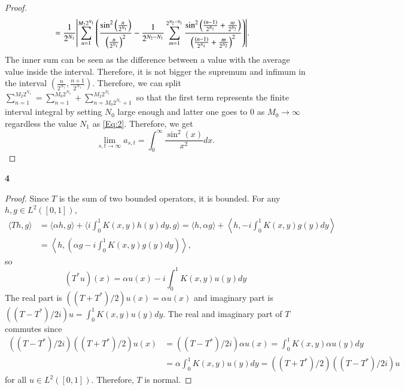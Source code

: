 \documentclass[a4paper, 12pt]{article}
\theoremstyle{Mydefinition}
\theoremstyle{Mytheorem}
\begin{document}
\begin{proof}
\begin{equation}
\begin{split}
    &= \frac{1}{2^{N_1}}\abs{\sum_{n=1}^{M_2 2^{N_1}}\left(\frac{\sin^2\left(\frac{n}{2^{N_1}}\right)}{\left(\frac{n}{2^{N_1}}\right)^2} - \frac{1}{2^{N_2-N_1}} \sum_{m=1}^{2^{N_2-N_1}}\frac{\sin^2\left(\frac{(n-1)}{2^{N_1} }+ \frac{m}{2^{N_2}}\right)}{\left(\frac{(n-1)}{2^{N_1}} + \frac{m}{2^{N_2}}\right)^2}\right)}.
\end{split}
\end{equation}
The inner sum can be seen as the difference between a value with the average value inside the interval. Therefore, it is not bigger the supremum and infimum in the interval $\left(\frac{n}{2^{N_1}}, \frac{n+1}{2^{N_1}}\right)$. Therefore, we can split $\sum_{n=1}^{M_2 2^{N_1}} = \sum_{n=1}^{M_0 2^{N_1}} + \sum_{n=M_0 2^{N_1} + 1}^{M_2 2^{N_1}}$ so that the first term represents the finite interval integral by setting $N_0$ large enough and latter one goes to $0$ as $M_0\rightarrow \infty$ regardless the value $N_1$ as \eqref{Eq:2}. Therefore, we get
\begin{equation}
    \lim_{s,t\rightarrow \infty} a_{s,t} = \int_0^\infty \frac{\sin^2(x)}{x^2}dx.
\end{equation}
\end{proof}






\noindent \textbf{4}
\begin{proof}
Since $T$ is the sum of two bounded operators, it is bounded. For any $h,g\in L^2([0,1])$,
\begin{equation}
\begin{split}
    \langle Th, g\rangle &= \langle \alpha h,g\rangle +\langle i\int_0^1 K(x,y)h(y) dy, g \rangle = \langle h, \alpha g\rangle + \left\langle h, -i\int_0^1 K(x,y)g(y)dy\right\rangle \\
    &= \left\langle h, \left(\alpha g - i\int_0^1 K(x,y)g(y)dy\right)\right\rangle,
\end{split}
\end{equation}
so 
\begin{equation}
    (T^*u)(x) = \alpha u(x) - i \int_0^1 K(x,y)u(y) dy
\end{equation}
The real part is $((T+T^*)/2)u(x) = \alpha u(x)$ and imaginary part is $((T-T^*)/2i)u = \int_0^1 K(x,y)u(y)dy$. The real and imaginary part of $T$ commutes since
\begin{equation}
\begin{split}
    ((T-T^*)/2i)((T+T^*)/2)u(x) &= ((T-T^*)/2i)\alpha u(x) = \int_0^1 K(x,y)\alpha u(y)dy \\
    &= \alpha\int_0^1 K(x,y)u(y)dy = ((T+T^*)/2)((T-T^*)/2i)u
\end{split}
\end{equation}
for all $u\in L^2([0,1])$. Therefore, $T$ is normal.
\end{proof}
\end{document}
